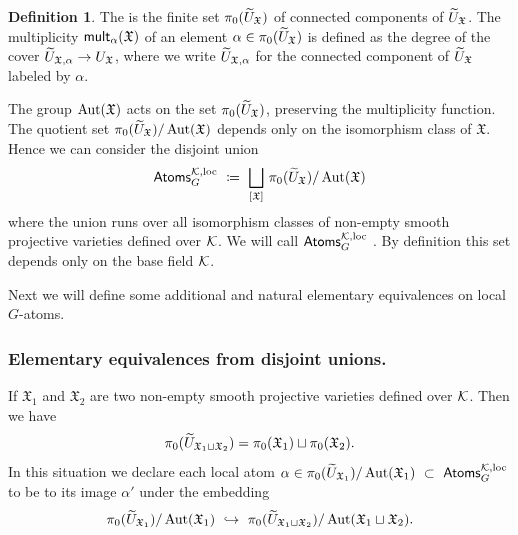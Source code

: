 \documentclass[twoside,leqno]{article}
\numberwithin{equation}{section}
\theoremstyle{plain}
\theoremstyle{definition}
\newtheorem{definition}[equation]{Definition}
\begin{document}
\begin{definition} \label{def:localGatoms} 
The  is the finite set $\pi_0(\widetilde{U}_{\mathfrak X})$ of connected components of  $\widetilde{U}_{\mathfrak X}$. 
The multiplicity $\mathsf{mult}_{\alpha}(\mathfrak X)$ of an element $\alpha \in \pi_{0}(\widetilde{U}_{\mathfrak X})$  is defined as the degree of the cover $\widetilde{U}_{\mathfrak X,\alpha} \to  U_{\mathfrak X}$, where we write $\widetilde U_{\mathfrak X,\alpha}$ for the connected component of $\widetilde{U}_{\mathfrak X}$ labeled by $\alpha$. 
\end{definition}


The group $\operatorname{Aut}(\mathfrak{X})$ acts on the set $\pi_{0}(\widetilde{U}_{\mathfrak X})$, preserving the multiplicity function. The quotient set $\pi_{0}(\widetilde{U}_{\mathfrak X})/\operatorname{Aut}(\mathfrak{X})$ depends only on the isomorphism class of $\mathfrak{X}$. Hence we can consider the disjoint union
\[
\mathsf{Atoms}_{G}^{\kay,\op{loc}} \ \coloneqq \ \bigsqcup_{[\mathfrak{X}]} \, 
\pi_{0}(\widetilde{U}_{\fX})/\op{Aut}(\mathfrak{X})
\]
where the union runs
over all isomorphism classes of non-empty smooth projective varieties defined over $\mathcal K$. We will call $\mathsf{Atoms}_{G}^{\mathcal K,\operatorname{loc}}$ . By definition this set depends only on the base field $\mathcal K$. 


\medskip


Next we will define some additional and natural 
elementary equivalences on local $G$-atoms.



\subsubsection{Elementary equivalences from disjoint unions.} \label{sssec:eqdisjointGatoms} 
If $\mathfrak{X}_1$ and $\mathfrak{X}_2$ are  two non-empty smooth projective varieties defined over $\mathcal K$. Then we have
\[
\pi_{0}(\widetilde{U}_{\mathfrak X_{1}\sqcup \mathfrak X_{2}})  = \pi_{0}(\mathfrak X_{1})\sqcup \pi_{0}(\mathfrak X_{2}).
\]
In this situation we declare each local atom $\alpha \in 
\pi_{0}(\widetilde{U}_{\fX_{1}})/\op{Aut}(\mathfrak{X}_{1}) \ \subset \ \mathsf{Atoms}_{G}^{\kay,\op{loc}}$ to be  to its image $\alpha'$ under the embedding
\[
\pi_{0}(\widetilde{U}_{\mathfrak{X}_1})/\operatorname{Aut}(\mathfrak{X}_{1}) \ \hookrightarrow \ \pi_{0}(\widetilde{U}_{\mathfrak{X}_1\sqcup \mathfrak{X}_2})/\operatorname{Aut}(\mathfrak{X}_{1}\sqcup \mathfrak{X}_{2}).
\]
\end{document}
